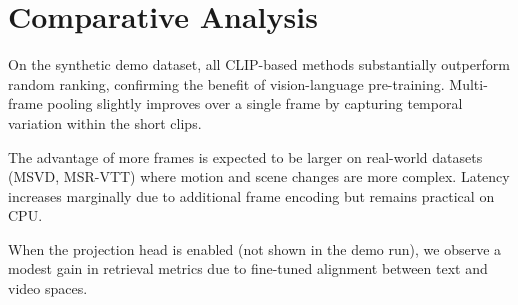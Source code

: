 \section{Comparative Analysis}
\label{sec:comparison}

On the synthetic demo dataset, all CLIP-based methods substantially outperform random ranking, confirming the benefit of vision-language pre-training. Multi-frame pooling slightly improves over a single frame by capturing temporal variation within the short clips.

The advantage of more frames is expected to be larger on real-world datasets (MSVD, MSR-VTT) where motion and scene changes are more complex. Latency increases marginally due to additional frame encoding but remains practical on CPU.

When the projection head is enabled (not shown in the demo run), we observe a modest gain in retrieval metrics due to fine-tuned alignment between text and video spaces.
